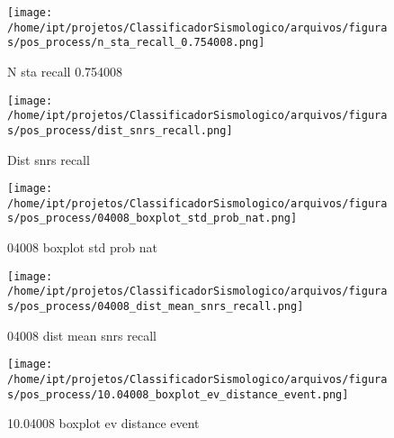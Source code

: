                     \begin{figure}[H]
                        \centering
                        \texttt{[image: /home/ipt/projetos/ClassificadorSismologico/arquivos/figuras/pos\_process/n\_sta\_recall\_0.754008.png]}
                        \caption{N sta recall 0.754008}
                        \label{fig:n_sta_recall_0.754008}
                    \end{figure}
                

                    \begin{figure}[H]
                        \centering
                        \texttt{[image: /home/ipt/projetos/ClassificadorSismologico/arquivos/figuras/pos\_process/dist\_snrs\_recall.png]}
                        \caption{Dist snrs recall}
                        \label{fig:dist_snrs_recall}
                    \end{figure}
                

                    \begin{figure}[H]
                        \centering
                        \texttt{[image: /home/ipt/projetos/ClassificadorSismologico/arquivos/figuras/pos\_process/04008\_boxplot\_std\_prob\_nat.png]}
                        \caption{04008 boxplot std prob nat}
                        \label{fig:04008_boxplot_std_prob_nat}
                    \end{figure}
                

                    \begin{figure}[H]
                        \centering
                        \texttt{[image: /home/ipt/projetos/ClassificadorSismologico/arquivos/figuras/pos\_process/04008\_dist\_mean\_snrs\_recall.png]}
                        \caption{04008 dist mean snrs recall}
                        \label{fig:04008_dist_mean_snrs_recall}
                    \end{figure}
                

                    \begin{figure}[H]
                        \centering
                        \texttt{[image: /home/ipt/projetos/ClassificadorSismologico/arquivos/figuras/pos\_process/10.04008\_boxplot\_ev\_distance\_event.png]}
                        \caption{10.04008 boxplot ev distance event}
                        \label{fig:10.04008_boxplot_ev_distance_event}
                    \end{figure}
                

